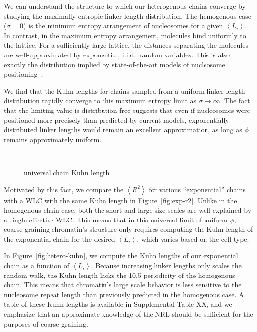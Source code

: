 \documentclass[%
 reprint,
superscriptaddress,
showpacs,preprintnumbers,
 amsmath,amssymb,
 aps,
 prl,
]{revtex4-1}
\newcommand{\RR}{\left\langle{}R^2\right\rangle{}}
\newcommand{\meanli}{\left\langle{}L_i\right\rangle}
\begin{document}
We can understand the structure to which our heterogenous chains converge by studying the
maximally entropic linker length distribution. The homogenous case ($\sigma=0$) is the
    minimum entropy arrangement of nucleosomes for a given $\meanli$. In
    contrast, in the maximum entropy arrangement, molecules bind uniformly to
    the lattice. For a sufficiently large lattice, the distances separating the
    molecules are well-approximated by exponential, i.i.d.\ random variables.
This is also exactly the distribution implied by  state-of-the-art models of nucleosome
    positioning~\cite{beshnova2014}.

We find that the Kuhn lengths for chains sampled from a
uniform linker length distribution rapidly converge to this
maximum entropy limit as $\sigma\to\infty$.
The fact that the limiting value is distribution-free suggests that even if nucleosomes were  positioned more precisely than predicted by current models, exponentially distributed linker lengths would remain an excellent approximation, as long as $\phi$ remains approximately uniform.

\begin{figure}
    \centering
    \mbox{%
    }\caption{universal chain Kuhn length}\label{fig:exp-chain}
\end{figure}


Motivated by this fact, we compare the $\RR$ for various
    ``exponential'' chains  with a WLC with the same Kuhn length in Figure~\ref{fig:exp-r2}.
Unlike in the homogenous chain case, both the short and large size scales are
    well explained by a single effective WLC.\@
This means that in this universal limit of uniform $\phi$, coarse-graining
    chromatin's structure only requires  computing the Kuhn length of the
    exponential chain for the desired $\meanli$, which varies based on the cell
    type.

In Figure~\ref{fig:hetero-kuhn}, we compute the Kuhn lengths of our exponential
    chain as a function of $\meanli$.
Because increasing linker lengths only scales the random walk, the Kuhn length
    lacks the \SI{10.5}{\basepair} periodicity of the homogenous chain.
This means that chromatin's large scale behavior is less sensitive to
    the nucleosome repeat length than previously predicted in the homogenous
    case.
A table of these Kuhn lengths is available in Supplemental Table XX, and we
    emphasize that an approximate knowledge of the NRL should be sufficient for
    the purposes of coarse-graining.
\end{document}
